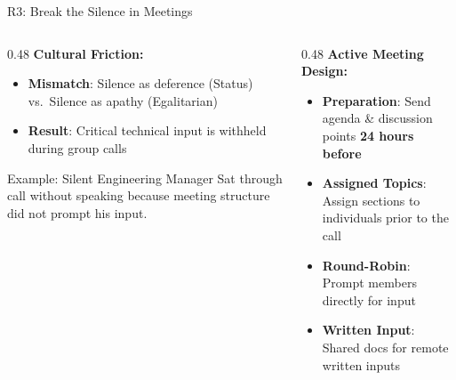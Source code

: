 \documentclass[aspectratio=169, 12pt]{beamer}
\newcommand{\presenter}[1]{\gdef\currentpresenter{#1}}
\gdef\currentpresenter{}
\begin{document}
\begin{frame}{R3: Break the Silence in Meetings}
\presenter{Presenter: Muhammad Danish JAVED}

\vspace{0.1em}

\begin{columns}[T]
\begin{column}{0.48\textwidth}
\textbf{Cultural Friction:}
\begin{itemize}
    \item \textbf{Mismatch}: Silence as deference (Status) vs.\ Silence as apathy (Egalitarian)
    \item \textbf{Result}: Critical technical input is withheld during group calls
\end{itemize}
\vspace{0.2em}
\begin{alertblock}{Example: Silent Engineering Manager}
Sat through call without speaking because meeting structure did not prompt his input.
\end{alertblock}
\end{column}

\begin{column}{0.48\textwidth}
\textbf{Active Meeting Design:}
\begin{itemize}
    \item \textbf{Preparation}: Send agenda \& discussion points \textbf{24 hours before}
    \item \textbf{Assigned Topics}: Assign sections to individuals prior to the call
    \item \textbf{Round-Robin}: Prompt members directly for input
    \item \textbf{Written Input}: Shared docs for remote written inputs
\end{itemize}
\end{column}
\end{columns}

\end{frame}

\end{document}
